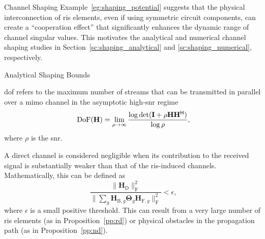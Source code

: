 \documentclass[journal]{IEEEtran}
\begin{document}
\begin{section}{Channel Shaping}
	Example~\ref{eg:shaping_potential} suggests that the physical interconnection of \gls{ris} elements, even if using symmetric circuit components, can create a ``cooperation effect'' that significantly enhances the dynamic range of channel singular values.
	This motivates the analytical and numerical channel shaping studies in Section~\ref{sc:shaping_analytical} and \ref{sc:shaping_numerical}, respectively.

	\begin{subsection}{Analytical Shaping Bounds}
		\label{sc:shaping_analytical}
		\begin{definition}
			\gls{dof} refers to the maximum number of streams that can be transmitted in parallel over a \gls{mimo} channel in the asymptotic high-\gls{snr} regime
			\begin{equation}
				\textnormal{DoF}(\mathbf{H}) = \lim_{\rho \to \infty} \frac{\log \det(\mathbf{I} + \rho \mathbf{H} \mathbf{H}^\mathsf{H})}{\log \rho},
			\end{equation}
			where $\rho$ is the \gls{snr}.
		\end{definition}

		\begin{definition}
			A direct channel is considered negligible when its contribution to the received signal is substantially weaker than that of the \gls{ris}-induced channels. Mathematically, this can be defined as
			\begin{equation*}
				\frac{\lVert \mathbf{H}_\mathrm{D} \rVert _\mathrm{F}^2}{\lVert \sum_g \mathbf{H}_{\mathrm{B},g} \mathbf{\Theta}_g \mathbf{H}_{\mathrm{F},g} \rVert _\mathrm{F}^2} < \epsilon,
			\end{equation*}
			where $\epsilon$ is a small positive threshold.
			This can result from a very large number of \gls{ris} elements (as in Proposition~\ref{pp:rd}) or physical obstacles in the propagation path (as in Proposition~\ref{pp:nd}).


\end{definition}
\end{subsection}
\end{section}
\end{document}
